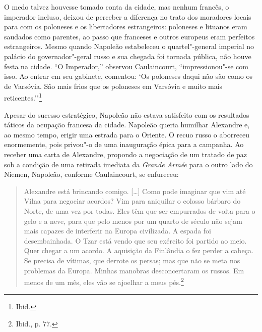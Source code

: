 O medo talvez houvesse tomado conta da cidade, mas nenhum francês, o
imperador incluso, deixou de perceber a diferença no trato dos moradores
locais para com os poloneses e os libertadores estrangeiros: poloneses e
lituanos eram saudados como parentes, ao passo que franceses e outros
europeus eram perfeitos estrangeiros. Mesmo quando Napoleão estabeleceu
o quartel"-general imperial no palácio do governador"-geral russo e sua
chegada foi tornada pública, não houve festa na cidade. ``O Imperador,''
observou Caulaincourt, ``impressionou"-se com isso. Ao entrar em seu
gabinete, comentou: `Os poloneses daqui não são como os de Varsóvia. São
mais frios que os poloneses em Varsóvia e muito mais
reticentes.'"\footnote{Ibid.}

Apesar do sucesso estratégico, Napoleão não estava satisfeito com os
resultados táticos da ocupação francesa da cidade. Napoleão queria
humilhar Alexandre e, ao mesmo tempo, erigir uma estrada para o Oriente.
O recuo russo o aborreceu enormemente, pois privou"-o de uma inauguração
épica para a campanha. Ao receber uma carta de Alexandre, propondo a
negociação de um tratado de paz sob a condição de uma retirada imediata
da \textit{Grande Armée} para o outro lado do Niemen, Napoleão, conforme
Caulaincourt, se enfureceu:

\begin{quote}
Alexandre está brincando comigo. [\ldots{}] Como pode imaginar que vim até
Vilna para negociar acordos? Vim para aniquilar o colosso bárbaro do
Norte, de uma vez por todas. Eles têm que ser empurrados de volta para o
gelo e a neve, para que pelo menos por um quarto de século não sejam
mais capazes de interferir na Europa civilizada. A espada foi
desembainhada. O Tzar está vendo que seu exército foi partido ao meio.
Quer chegar a um acordo. A aquisição da Finlândia o fez perder a cabeça.
Se precisa de vítimas, que derrote os persas; mas que não se meta nos
problemas da Europa. Minhas manobras desconcertaram os russos. Em menos
de um mês, eles vão se ajoelhar a meus pés.\footnote{Ibid., p. 77.}
\end{quote}

